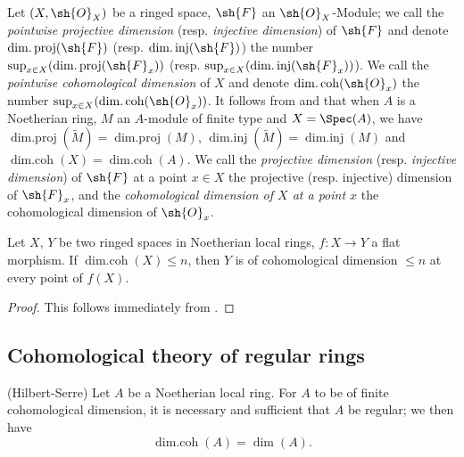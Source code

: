 \begin{env}[17.2.14]
\label{0.17.2.14}
Let $(X,\sh{O}_X)$ be a ringed space, $\sh{F}$ an $\sh{O}_X$-Module;
we call the \emph{pointwise projective dimension} (resp. \emph{injective dimension}) of $\sh{F}$ and denote $\operatorname{dim.proj}(\sh{F})$ (resp. $\operatorname{dim.inj}(\sh{F})$) the number $\sup_{x\in X}(\operatorname{dim.proj}(\sh{F}_x))$ (resp. $\sup_{x\in X}(\operatorname{dim.inj}(\sh{F}_x))$).
We call the \emph{pointwise cohomological dimension} of $X$ and denote $\operatorname{dim.coh}(\sh{O}_x)$ the number $\sup_{x\in X}(\operatorname{dim.coh}(\sh{O}_x))$.
It follows from  and  that when $A$ is a Noetherian ring, $M$ an $A$-module of finite type and $X=\Spec(A)$, we have $\operatorname{dim.proj}(\widetilde{M})=\operatorname{dim.proj}(M)$, $\operatorname{dim.inj}(\widetilde{M})=\operatorname{dim.inj}(M)$ and $\operatorname{dim.coh}(X)=\operatorname{dim.coh}(A)$.
We call the \emph{projective dimension} (resp. \emph{injective dimension}) of $\sh{F}$ at a point $x\in X$ the projective (resp. injective) dimension of $\sh{F}_x$, and the \emph{cohomological dimension of $X$ at a point $x$} the cohomological dimension of $\sh{O}_x$.
\end{env}

\begin{proposition}[17.2.15]
\label{0.17.2.15}
Let $X$, $Y$ be two ringed spaces in Noetherian local rings, $f:X\to Y$ a flat morphism.
If $\operatorname{dim.coh}(X)\leq n$, then $Y$ is of cohomological dimension $\leq n$ at every point of $f(X)$.
\end{proposition}

\begin{proof}
This follows immediately from .
\end{proof}

\subsection{Cohomological theory of regular rings}
\label{subsection:0.17.3}

\begin{theorem}[17.3.1]
\label{0.17.3.1}
\textnormal{(Hilbert-Serre)}
Let $A$ be a Noetherian local ring.
For $A$ to be of finite cohomological dimension, it is necessary and sufficient that $A$ be regular; we then have
\[
\label{0.17.3.1.1}
  \operatorname{dim.coh}(A)=\dim(A).
  \tag{17.3.1.1}
\]
\end{theorem}

